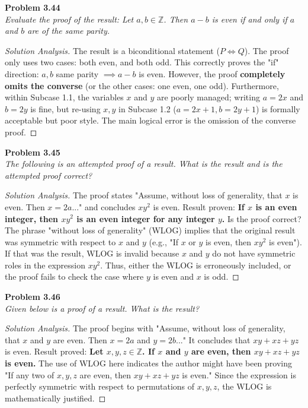\documentclass[11pt, letterpaper]{article}
\theoremstyle{definition}
\theoremstyle{remark}
\newcommand{\Z}{\mathbb{Z}}
\begin{document}
\textbf{Problem 3.44} \\
\textit{Evaluate the proof of the result: Let $a,b \in \Z$. Then $a-b$ is even if and only if $a$ and $b$ are of the same parity.}
\begin{proof}[Solution Analysis]
The result is a biconditional statement ($P \iff Q$). The proof only uses two cases: both even, and both odd. This correctly proves the "if" direction: $a,b$ same parity $\implies a-b$ is even. However, the proof \textbf{completely omits the converse} (or the other cases: one even, one odd). Furthermore, within Subcase 1.1, the variables $x$ and $y$ are poorly managed; writing $a=2x$ and $b=2y$ is fine, but re-using $x,y$ in Subcase 1.2 ($a=2x+1, b=2y+1$) is formally acceptable but poor style. The main logical error is the omission of the converse proof.
\end{proof}

\textbf{Problem 3.45} \\
\textit{The following is an attempted proof of a result. What is the result and is the attempted proof correct?}
\begin{proof}[Solution Analysis]
The proof states "Assume, without loss of generality, that $x$ is even. Then $x=2a$..." and concludes $xy^2$ is even. 
Result proven: \textbf{If $x$ is an even integer, then $xy^2$ is an even integer for any integer $y$.}
Is the proof correct? The phrase "without loss of generality" (WLOG) implies that the original result was symmetric with respect to $x$ and $y$ (e.g., "If $x$ or $y$ is even, then $xy^2$ is even"). If that was the result, WLOG is invalid because $x$ and $y$ do not have symmetric roles in the expression $xy^2$. Thus, either the WLOG is erroneously included, or the proof fails to check the case where $y$ is even and $x$ is odd.
\end{proof}

\textbf{Problem 3.46} \\
\textit{Given below is a proof of a result. What is the result?}
\begin{proof}[Solution Analysis]
The proof begins with "Assume, without loss of generality, that $x$ and $y$ are even. Then $x=2a$ and $y=2b$..." It concludes that $xy + xz + yz$ is even.
Result proved: \textbf{Let $x, y, z \in \Z$. If $x$ and $y$ are even, then $xy+xz+yz$ is even.} 
The use of WLOG here indicates the author might have been proving "If any two of $x,y,z$ are even, then $xy+xz+yz$ is even." Since the expression is perfectly symmetric with respect to permutations of $x,y,z$, the WLOG is mathematically justified.
\end{proof}
\end{document}
